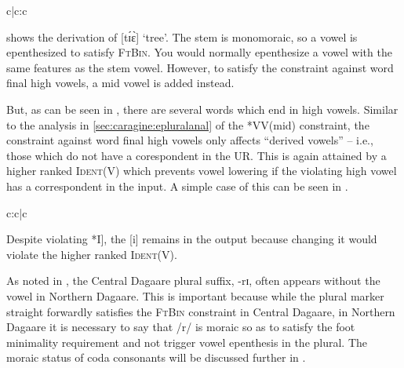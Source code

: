\documentclass[output=paper,colorlinks,citecolor=brown,
]{langscibook}
\begin{document}
\begin{table}

  \caption{Tableau deriving [tɪɛ] `tree' in ND}
  \label{tab:Caragine:tree}

\begin{tableau}{c|c:c} 
\const{*I]} 
 \vio{*!} \vio{} \vio{*} 
 \vio{} \vio{*} \vio{*!}  
 \vio{} \vio{*} \vio{}
\end{tableau}
\end{table}


 shows the derivation of [tɪ́ɛ̀] ‘tree’. The stem is monomoraic, so a vowel is epenthesized to satisfy \textsc{FtBin}. You would normally epenthesize a vowel with the same features as the stem vowel. However, to satisfy the constraint against word final high vowels, a mid vowel is added instead. 

But, as can be seen in , there are several words which end in high vowels. Similar to the analysis in \ref{sec:caragine:epluralanal} of the *VV(mid) constraint, the constraint against word final high vowels only affects ``derived vowels'' -- i.e., those which do not have a corespondent in the UR. This is again attained by a higher ranked \textsc{Ident}(V) which prevents vowel lowering if the violating high vowel has a correspondent in the input. A simple case of this can be seen in .

\begin{table}

  \caption{Tableau deriving [gadoɾi] `bed' in Northern Dagaare}
  \label{tab:Caragine:bed}

\begin{tableau}{c:c|c} 
\const{*I]} 
 \vio{} \vio{}\vio{*} 
 \vio{*!} \vio{}\vio{} 
 \vio{} \vio{*!}\vio{}
\end{tableau}
\end{table}

\noindent Despite violating *I], the [i] remains in the output because changing it would violate the higher ranked \textsc{Ident(V)}. 

As noted in , the Central Dagaare plural suffix, -rɪ, often appears without the vowel in Northern Dagaare. This is important because while the plural marker straight forwardly satisfies the \textsc{FtBin} constraint in Central Dagaare, in Northern Dagaare it is necessary to say that /r/ is moraic so as to satisfy the foot minimality requirement and not trigger vowel epenthesis in the plural. The moraic status of coda consonants will be discussed further in  .
\end{document}
